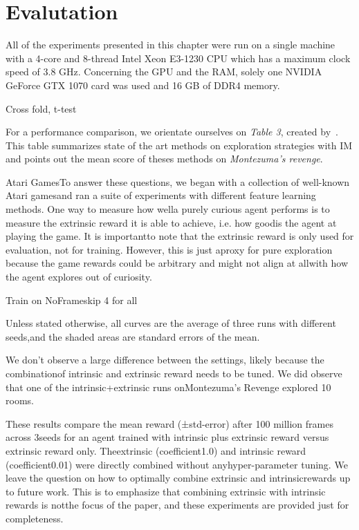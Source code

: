 \documentclass[draft,final]{vutinfth} %
\begin{document}
    \section{Evalutation}
    All of the experiments presented in this chapter were run on a single machine with a 4-core and 8-thread Intel Xeon E3-1230 CPU which has a maximum clock speed of 3.8 GHz.
    Concerning the GPU and the RAM, solely one NVIDIA GeForce GTX 1070 card was used and 16 GB of DDR4 memory.

 Cross fold, t-test
    \citep{francois-lavet_introduction_2018}

    For a performance comparison, we orientate ourselves on \textit{Table 3}, created by~\cite{aubret_survey_2019}. This table summarizes state of the art methods on exploration strategies with IM and points out the mean score of theses methods on \textit{Montezuma's revenge}.


    Atari GamesTo answer these questions, we began with a collection of well-known Atari gamesand ran a suite of experiments with different feature learning methods. One way to measure how wella purely curious agent performs is to measure the extrinsic reward it is able to achieve, i.e. how goodis the agent at playing the game. It is importantto note that the extrinsic reward is only used for evaluation, not for training. However, this is just aproxy for pure exploration because the game rewards could be arbitrary and might not align at allwith how the agent explores out of curiosity.


    Train on NoFrameskip 4 for all

    Unless stated otherwise, all curves are the average of three runs with different seeds,and the shaded areas are standard errors of the mean.

    We don’t observe a large difference between the settings, likely because the combinationof intrinsic and extrinsic reward needs to be tuned. We did observe that one of the intrinsic+extrinsic runs onMontezuma’s Revenge explored 10 rooms.


    These results compare the mean reward (±std-error) after 100 million frames across 3seeds for an agent trained with intrinsic plus extrinsic reward versus extrinsic reward only. Theextrinsic (coefficient1.0) and intrinsic reward (coefficient0.01) were directly combined without anyhyper-parameter tuning. We leave the question on how to optimally combine extrinsic and intrinsicrewards up to future work. This is to emphasize that combining extrinsic with intrinsic rewards is notthe focus of the paper, and these experiments are provided just for completeness.
\end{document}
